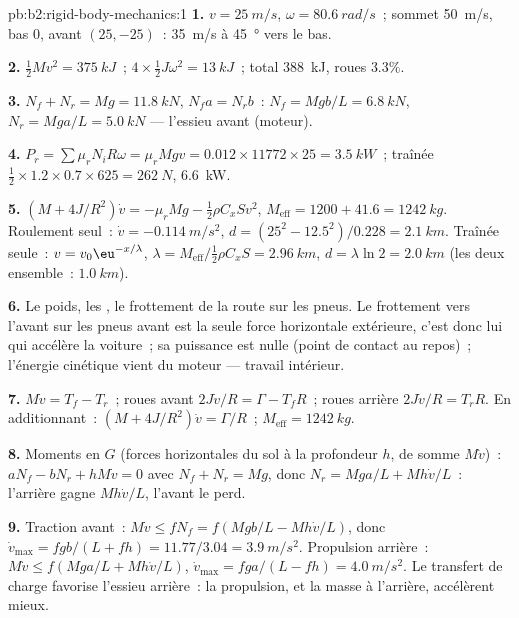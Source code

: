 \begin{solution}{pb:b2:rigid-body-mechanics:1}
\textbf{1.} $v = \qty{25}{m/s}$, $\omega = \qty{80.6}{rad/s}$~; sommet \qty{50}{m/s},
bas $0$, avant $(25, -25)$~: \qty{35}{m/s} à \qty{45}{\degree} vers le bas.

\textbf{2.} $\tfrac12Mv^2 = \qty{375}{kJ}$~; $4 \times \tfrac12J\omega^2 = \qty{13}{kJ}$~;
total \qty{388}{kJ}, roues $3.3\%$.

\textbf{3.} $N_f + N_r = Mg = \qty{11.8}{kN}$, $N_fa = N_rb$~: $N_f = Mgb/L =
\qty{6.8}{kN}$, $N_r = Mga/L = \qty{5.0}{kN}$ --- l'essieu avant (moteur).

\textbf{4.} $P_r = \sum\mu_rN_iR\omega = \mu_rMgv = 0.012 \times 11772 \times 25 =
\qty{3.5}{kW}$~; traînée $\tfrac12 \times 1.2 \times 0.7 \times 625 = \qty{262}{N}$, \qty{6.6}{kW}.

\textbf{5.} $(M + 4J/R^2)\dot v = -\mu_rMg - \tfrac12\rho C_xSv^2$, $M_{\text{eff}} =
1200 + 41.6 = \qty{1242}{kg}$. Roulement seul~: $\dot v = \qty{-0.114}{m/s^2}$,
$d = (25^2 - 12.5^2)/0.228 = \qty{2.1}{km}$. Traînée seule~: $v = v_0\eu^{-x/\lambda}$,
$\lambda = M_{\text{eff}}/\tfrac12\rho C_xS = \qty{2.96}{km}$, $d = \lambda\ln2 =
\qty{2.0}{km}$ (les deux ensemble~: $\qty{1.0}{km}$).

\textbf{6.} Le poids, les , le frottement de la route sur les pneus.
Le frottement vers l'avant sur les pneus avant est la seule force horizontale
extérieure, c'est donc lui qui accélère la voiture~; sa puissance est nulle (point de contact au
repos)~; l'énergie cinétique vient du moteur --- travail intérieur.

\textbf{7.} $M\dot v = T_f - T_r$~; roues avant $2J\dot v/R = \Gamma - T_fR$~;
roues arrière $2J\dot v/R = T_rR$. En additionnant~: $(M + 4J/R^2)\dot v = \Gamma/R$~;
$M_{\text{eff}} = \qty{1242}{kg}$.

\textbf{8.} Moments en $G$ (forces horizontales du sol à la profondeur $h$,
de somme $M\dot v$)~: $aN_f - bN_r + hM\dot v = 0$ avec $N_f + N_r = Mg$, donc
$N_r = Mga/L + Mh\dot v/L$~: l'arrière gagne $Mh\dot v/L$, l'avant le perd.

\textbf{9.} Traction avant~: $M\dot v \le fN_f = f(Mgb/L - Mh\dot v/L)$, donc
$\dot v_{\max} = fgb/(L + fh) = 11.77/3.04 = \qty{3.9}{m/s^2}$. Propulsion arrière~:
$M\dot v \le f(Mga/L + Mh\dot v/L)$, $\dot v_{\max} = fga/(L - fh) = \qty{4.0}{m/s^2}$.
Le transfert de charge favorise l'essieu arrière~: la propulsion, et la masse à l'arrière,
accélèrent mieux.


\end{solution}
